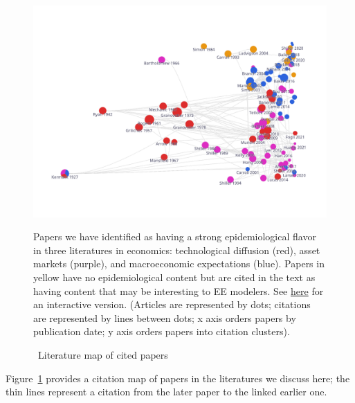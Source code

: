 \begin{figure}[!ht] \centering  %
  \caption{ ~Literature map of cited papers}
  \label{fig:graph_mixer}
  \centerline{\includegraphics[width=\textwidth]{./figures/graph_mixer}}
  \begin{flushleft}
    {\footnotesize Papers we have identified as having a strong epidemiological flavor in three literatures in economics: technological diffusion (red), asset markets (purple), and macroeconomic expectations (blue).  Papers in yellow have no epidemiological content but are cited in the text as having content that may be interesting to EE modelers. See \href{https://app.litmaps.co/shared/89EF6E28-98E7-4406-AA0F-BE8045A0571C}{here} for an interactive version.  (Articles are represented by dots; citations are represented by lines between dots; x axis orders papers by publication date; y axis orders papers into citation clusters).}  %
  \end{flushleft}
\end{figure}

Figure~\ref{fig:graph_mixer} provides a citation map of papers in the literatures we discuss here; the thin lines represent a citation from the later paper to the linked earlier one.

